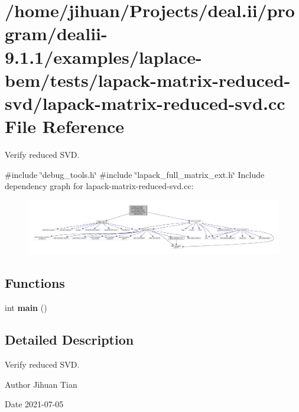 \hypertarget{lapack-matrix-reduced-svd_8cc}{}\section{/home/jihuan/\+Projects/deal.ii/program/dealii-\/9.1.1/examples/laplace-\/bem/tests/lapack-\/matrix-\/reduced-\/svd/lapack-\/matrix-\/reduced-\/svd.cc File Reference}
\label{lapack-matrix-reduced-svd_8cc}


Verify reduced S\+VD.  


{\ttfamily \#include \char`\"{}debug\+\_\+tools.\+h\char`\"{}}\newline
{\ttfamily \#include \char`\"{}lapack\+\_\+full\+\_\+matrix\+\_\+ext.\+h\char`\"{}}\newline
Include dependency graph for lapack-\/matrix-\/reduced-\/svd.cc\+:
\nopagebreak
\begin{figure}[H]
\begin{center}
\leavevmode
\includegraphics[width=350pt]{lapack-matrix-reduced-svd_8cc__incl}
\end{center}
\end{figure}
\subsection*{Functions}
\begin{DoxyCompactItemize}
\item 
\mbox{\label{lapack-matrix-reduced-svd_8cc_ae66f6b31b5ad750f1fe042a706a4e3d4}} 
int {\bfseries main} ()
\end{DoxyCompactItemize}


\subsection{Detailed Description}
Verify reduced S\+VD. 

\begin{DoxyAuthor}{Author}
Jihuan Tian 
\end{DoxyAuthor}
\begin{DoxyDate}{Date}
2021-\/07-\/05 
\end{DoxyDate}
